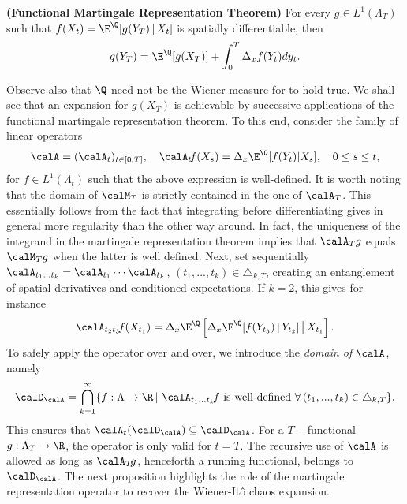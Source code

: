 \begin{theorem}\label{thm:FMRT}\textbf{(Functional Martingale Representation Theorem)}
 For every $g \in L^1(\Lambda_T)$ %
 such that  $f(X_{t})= \E^{\Q}[g(Y_T) \,|\, X_{t}]$ is {spatially differentiable},
then 
\begin{equation}\label{eq:FMRT}
   g(Y_T) = \E^{\Q}[g(X_T)] + \int_0^T \Delta_x f(Y_t) dy_t. 
\end{equation}
\end{theorem}
Observe also that $\Q$ need not be the Wiener measure for   to hold true. 
We shall see that an expansion for $g(X_T)$ is achievable by  successive applications of the functional martingale representation theorem. %
To this end, consider the family of linear operators%
\begin{equation} \label{eq:opA}
    \calA = (\calA_t)_{t\in [0,T]}, \quad   \calA_{t}\! f(X_s) = \Delta_x\E^{\Q}[f(Y_t) | X_s], \quad 0 \le s\le t,
\end{equation}
for $f\in L^1(\Lambda_t)$ such that the above expression is well-defined.   
 It is worth noting that the domain of $\calM_T$ is strictly contained in the one of $\calA_T$. This essentially follows from the fact that integrating 
 before differentiating gives in general more regularity than the other way around.  In fact, the uniqueness of the integrand in the martingale representation theorem implies that $\calA_Tg $ equals $\calM_Tg$ when the latter is  well defined.  
Next, set sequentially $\calA_{t_1...t_k} = \calA_{t_1} \cdots \calA_{t_k}$, $(t_1,...,t_k) \in \triangle_{k,T}$, creating an entanglement of spatial derivatives and conditioned expectations. If $k=2$, this gives for instance
$$\calA_{t_2t_3}\!  f(X_{t_1}) = \Delta_x \E^{\Q}\left[ \Delta_x \E^{\Q}[ f(Y_{t_3}) \, | \, Y_{t_2}]  \, \big | \, X_{t_1} \right].$$
To safely apply the operator over and over, we introduce the \textit{domain of $\calA$}, namely
$$\calD_{\calA} = \bigcap_{k=1}^\infty \{f:\Lambda \to \R\,|\, \, \calA_{t_1...t_k} \! f \text{ is well-defined } \forall \,  (t_1,...,t_k) \in \triangle_{k,T} \}.$$
This ensures that  $\calA_t(\calD_{\calA}) \subseteq \calD_{\calA}$.
For a $T-$functional $g:\Lambda_T \to \R$,  the  operator is only valid for $t=T$.  %
The recursive use of $\calA$ is %
allowed as long as  $\calA_T \! g$, henceforth a running functional, belongs to  $\calD_{\calA}$. 
The next proposition highlights the role of the martingale representation operator to recover the  Wiener-Itô chaos expansion.


